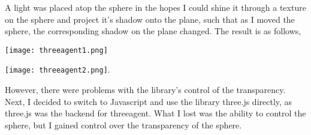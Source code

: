 \documentclass{article}
\begin{document}
A light was placed atop the sphere in the hopes I could shine it
through a texture on the sphere and project it's shadow onto the
plane, such that as I moved the sphere, the corresponding shadow on
the plane changed. The result is as follows,

\begin{minipage}{0.5\textwidth}
  \texttt{[image: threeagent1.png]}
\end{minipage}
\begin{minipage}{0.5\textwidth}
  \texttt{[image: threeagent2.png]}.
\end{minipage}

However, there were problems with the library's control of the
transparency. Next, I decided to switch to Javascript and use the
library three.js directly, as three.js was the backend for
threeagent. What I lost was the ability to control the sphere, but I
gained control over the transparency of the sphere.
\end{document}
